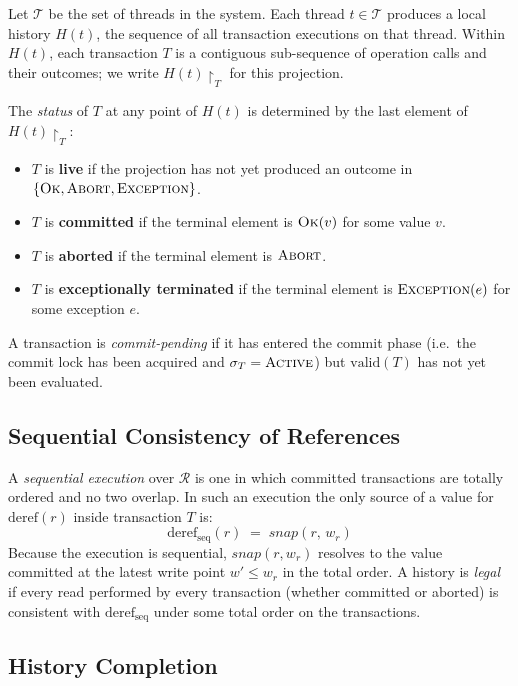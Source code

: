 Let $\mathcal{T}$ be the set of threads in the system. Each thread
$t \in \mathcal{T}$ produces a local history $H(t)$, the sequence of all
transaction executions on that thread. Within $H(t)$, each transaction $T$
is a contiguous sub-sequence of operation calls and their outcomes; we write
$H(t)\!\upharpoonright_{T}$ for this projection.

The \emph{status} of $T$ at any point of $H(t)$ is determined by the last
element of $H(t)\!\upharpoonright_{T}$:

\begin{itemize}
  \item $T$ is \textbf{live} if the projection has not yet produced an outcome
        in $\{\textsc{Ok}, \textsc{Abort}, \textsc{Exception}\}$.
  \item $T$ is \textbf{committed} if the terminal element is $\textsc{Ok}(v)$
        for some value $v$.
  \item $T$ is \textbf{aborted} if the terminal element is $\textsc{Abort}$.
  \item $T$ is \textbf{exceptionally terminated} if the terminal element is
        $\textsc{Exception}(e)$ for some exception $e$.
\end{itemize}

A transaction is \emph{commit-pending} if it has entered the commit phase
(i.e.\ the commit lock has been acquired and $\sigma_T = \textsc{Active}$)
but $\text{valid}(T)$ has not yet been evaluated.

\subsection{Sequential Consistency of References}
\label{subsec:seq-spec}

A \emph{sequential execution} over $\mathcal{R}$ is one in which committed
transactions are totally ordered and no two overlap. In such an execution the
only source of a value for $\text{deref}(r)$ inside transaction $T$ is:
\[
  \text{deref}_{\mathrm{seq}}(r) \;=\; \mathit{snap}(r,\, w_r)
\]
Because the execution is sequential, $\mathit{snap}(r, w_r)$ resolves to the
value committed at the latest write point $w' \leq w_r$ in the total order.
A history is \emph{legal} if every read performed by every transaction (whether
committed or aborted) is consistent with $\text{deref}_{\mathrm{seq}}$ under
some total order on the transactions.

\subsection{History Completion}
\label{subsec:completion}


